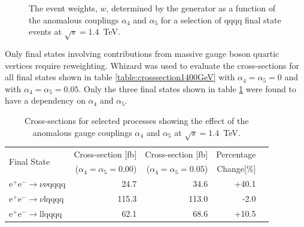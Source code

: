 \begin{figure}[h!]
\caption[The event weights, $w$, determined by the generator as a function of the anomalous couplings $\alpha_{4}$ and $\alpha_{5}$ for a selection of \nu{\nu}qqqq final state events at $\sqrt{s}=1.4$~TeV.]{The event weights, $w$, determined by the generator as a function of the anomalous couplings $\alpha_{4}$ and $\alpha_{5}$ for a selection of \nu{\nu}qqqq final state events at $\sqrt{s}=1.4$~TeV.}
\label{fig:eventweights1400raw}
\end{figure}

Only final states involving contributions from massive gauge boson quartic vertices require reweighting.  Whizard was used to evaluate the cross-sections for all final states shown in table \ref{table:crosssection1400GeV} with $\alpha_{4}=\alpha_{5}=0$ and with $\alpha_{4}=\alpha_{5}=0.05$.  Only the three final states shown in table \ref{table:crosssectionsensitivity1400} were found to have a dependency on $\alpha_{4}$ and $\alpha_{5}$.  

\begin{table}[h!]
\centering
\begin{tabular}{ l r r r r }
\hline
\multirow{ 2}{*}{Final State} & Cross-section [fb] & Cross-section [fb] & Percentage \\ 
& ($\alpha_{4} = \alpha_{5} = 0.00$) & ($\alpha_{4} = \alpha_{5} = 0.05$) & Change[\%] \\ 
\hline
$\text{e}^{+}\text{e}^{-} \rightarrow \nu{\nu}\text{qqqq}$ & 24.7 & 34.6 & +40.1 \\
$\text{e}^{+}\text{e}^{-} \rightarrow \nu\text{lqqqq}$ & 115.3 & 113.0 & -2.0 \\
$\text{e}^{+}\text{e}^{-} \rightarrow \text{llqqqq}$ & 62.1 & 68.6 & +10.5 \\
\hline
\end{tabular}
\caption[Cross-sections for selected processes showing the effect of the anomalous gauge couplings $\alpha_{4}$ and $\alpha_{5}$ at $\sqrt{s}=1.4$~TeV.]{Cross-sections for selected processes showing the effect of the anomalous gauge couplings $\alpha_{4}$ and $\alpha_{5}$ at $\sqrt{s}=1.4$~TeV.}
\label{table:crosssectionsensitivity1400}
\end{table}

